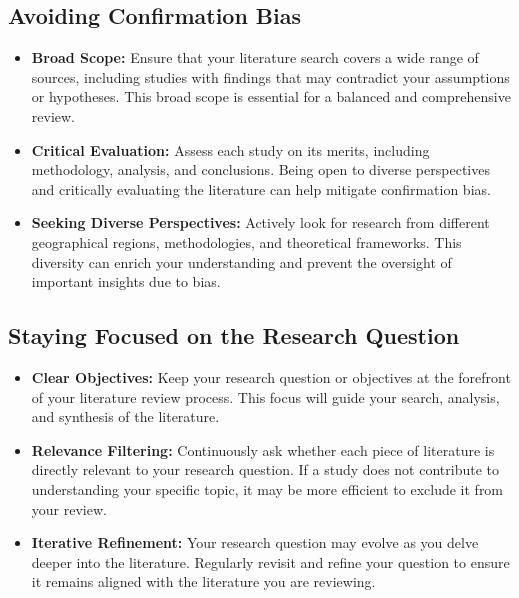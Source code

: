\documentclass[
]{book}
\begin{document}
\hypertarget{avoiding-confirmation-bias}{%
\subsection*{Avoiding Confirmation Bias}\label{avoiding-confirmation-bias}}

\begin{itemize}
\item
  \textbf{Broad Scope:} Ensure that your literature search covers a wide range of sources, including studies with findings that may contradict your assumptions or hypotheses. This broad scope is essential for a balanced and comprehensive review.
\item
  \textbf{Critical Evaluation:} Assess each study on its merits, including methodology, analysis, and conclusions. Being open to diverse perspectives and critically evaluating the literature can help mitigate confirmation bias.
\item
  \textbf{Seeking Diverse Perspectives:} Actively look for research from different geographical regions, methodologies, and theoretical frameworks. This diversity can enrich your understanding and prevent the oversight of important insights due to bias.
\end{itemize}

\hypertarget{staying-focused-on-the-research-question}{%
\subsection*{Staying Focused on the Research Question}\label{staying-focused-on-the-research-question}}

\begin{itemize}
\item
  \textbf{Clear Objectives:} Keep your research question or objectives at the forefront of your literature review process. This focus will guide your search, analysis, and synthesis of the literature.
\item
  \textbf{Relevance Filtering:} Continuously ask whether each piece of literature is directly relevant to your research question. If a study does not contribute to understanding your specific topic, it may be more efficient to exclude it from your review.
\item
  \textbf{Iterative Refinement:} Your research question may evolve as you delve deeper into the literature. Regularly revisit and refine your question to ensure it remains aligned with the literature you are reviewing.
\end{itemize}
\end{document}

